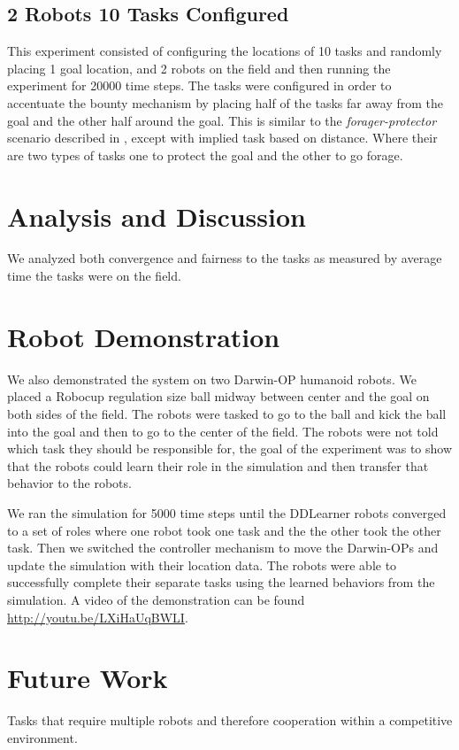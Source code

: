 \documentclass[twocolumn]{article}
\begin{document}
\subsection{2 Robots 10 Tasks Configured}

This experiment consisted of configuring the locations of 10 tasks and randomly placing 1 goal location, and 2 robots on the field and then running the experiment for 20000 time steps.  The tasks were configured in order to accentuate the bounty mechanism by placing half of the tasks far away from the goal and the other half around the goal.  This is similar to the \textit{forager-protector} scenario described in \cite{Campbell2010}, except with implied task based on distance.  Where their are two types of tasks one to protect the goal and the other to go forage.

\section{Analysis and Discussion}

We analyzed both convergence and fairness to the tasks as measured by average time the tasks were on the field.

\section{Robot Demonstration}
We also demonstrated the system on two Darwin-OP humanoid robots.  We placed a Robocup regulation size ball midway between center and the goal on both sides of the field.  The robots were tasked to go to the ball and kick the ball into the goal and then to go to the center of the field.  The robots were not told which task they should be responsible for, the goal of the experiment was to show that the robots could learn their role in the simulation and then transfer that behavior to the robots.    

We ran the simulation for 5000 time steps until the DDLearner robots converged to a set of roles where one robot took one task and the the other took the other task.  Then we switched the controller mechanism to move the Darwin-OPs and update the simulation with their location data.  The robots were able to successfully complete their separate tasks using the learned behaviors from the simulation.  A video of the demonstration can be found \url{http://youtu.be/LXiHaUqBWLI}.

\section{Future Work}
Tasks that require multiple robots and therefore cooperation within a competitive environment.  



\end{document}
